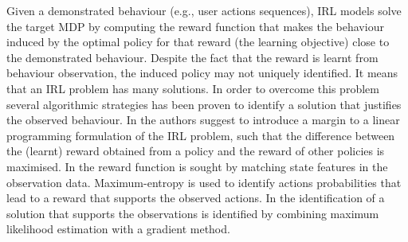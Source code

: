 Given a demonstrated behaviour (e.g., user actions sequences), IRL models solve the target MDP by computing the reward function that makes the behaviour induced by the optimal policy for that reward (the learning objective) close to the demonstrated behaviour.
Despite the fact that the reward is learnt from behaviour observation, the induced policy may not uniquely identified. It means that an IRL problem has many solutions. In order to overcome this problem several algorithmic strategies has been proven to identify a solution that justifies the observed behaviour. In \cite{ng:2000} the authors suggest to introduce a margin to a linear programming formulation of the IRL problem, such that the difference between the (learnt) reward obtained from a policy and the reward of other policies is maximised. In \cite{maxentirl} the reward function is sought by matching state features in the observation data. Maximum-entropy is used to identify actions probabilities that lead to a reward that supports the observed actions.
In \cite{vro:litt:2011} the identification of a solution that supports the observations is identified by combining maximum likelihood estimation with a gradient method.



